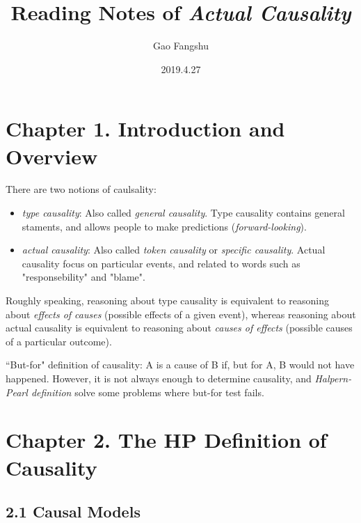\documentclass{article}
\title{Reading Notes of \textit{Actual Causality}}
\author{Gao Fangshu}
\date{2019.4.27}
\begin{document}
\maketitle
\section*{Chapter 1. Introduction and Overview}
There are two notions of caulsality:
\begin{itemize}
\item \textit{type causality}: Also called \textit{general causality}. Type causality contains general staments, and allows people to make predictions (\textit{forward-looking}). 
\item \textit{actual causality}: Also called \textit{token causality} or \textit{specific causality}. Actual causality focus on particular events, and related to words such as "responsebility" and "blame".
\end{itemize}

Roughly speaking, reasoning about type causality is equivalent to reasoning about \textit{effects of causes} (possible effects of a given event), whereas reasoning about actual causality is equivalent to reasoning about \textit{causes of effects} (possible causes of a particular outcome).

``But-for" definition of causality: A is a cause of B if, but for A, B would not have happened. However, it is not always enough to determine causality, and \textit{Halpern-Pearl definition} solve some problems where but-for test fails.

\section*{Chapter 2. The HP Definition of Causality}
\subsection*{2.1 Causal Models}
\end{document}
